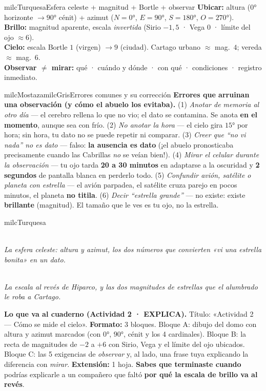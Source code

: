 \documentclass[11pt,letterpaper]{article}
\newcommand{\guiaDiagrama}[2]{%
\begin{center}
\\[1.5mm]
{\footnotesize\itshape\textcolor{milcNegro!75}{#2}}
\end{center}
}
\begin{document}
\begin{drawbox}{milcTurquesa}{Esfera celeste + magnitud + Bortle + observar}
\textbf{Ubicar:} altura ($0°$ horizonte $\to 90°$ cénit) + azimut ($N=0°$, $E=90°$, $S=180°$, $O=270°$). \\[1mm]
\textbf{Brillo:} magnitud aparente, escala \emph{invertida} (Sirio $-1{,}5$ · Vega $0$ · límite del ojo $\approx 6$). \\[1mm]
\textbf{Cielo:} escala Bortle $1$ (virgen) $\to 9$ (ciudad). Cartago urbano $\approx$ mag.\ $4$; vereda $\approx$ mag.\ $6$. \\[1mm]
\textbf{Observar $\neq$ mirar:} qué · cuándo y dónde · con qué · condiciones · registro inmediato.
\end{drawbox}

\begin{softbox}{milcMostaza}{milcGris}{Errores comunes y su corrección}
\textbf{Errores que arruinan una observación (y cómo el abuelo los evitaba).} (1) \emph{Anotar de memoria al otro día} --- el cerebro rellena lo que no vio; el dato se contamina. Se anota \textbf{en el momento}, aunque sea con frío. (2) \emph{No anotar la hora} --- el cielo gira $15°$ por hora; sin hora, tu dato no se puede repetir ni comparar. (3) \emph{Creer que ``no vi nada'' no es dato} --- falso: \textbf{la ausencia es dato} (¡el abuelo pronosticaba precisamente cuando las Cabrillas \emph{no} se veían bien!). (4) \emph{Mirar el celular durante la observación} --- tu ojo tarda \textbf{20 a 30 minutos} en adaptarse a la oscuridad y \textbf{2 segundos} de pantalla blanca en perderlo todo. (5) \emph{Confundir avión, satélite o planeta con estrella} --- el avión parpadea, el satélite cruza parejo en pocos minutos, el planeta \textbf{no titila}. (6) \emph{Decir ``estrella grande''} --- no existe: existe \textbf{brillante} (magnitud). El tamaño que le ves es tu ojo, no la estrella.
\end{softbox}

\begin{infoband}{milcTurquesa}
\guiaDiagrama{assets/astronomia-1/esfera-celeste.tex}{La esfera celeste: altura y azimut, los dos números que convierten «vi una estrella bonita» en un dato.}
\guiaDiagrama{assets/astronomia-1/escala-magnitud.tex}{La escala al revés de Hiparco, y las dos magnitudes de estrellas que el alumbrado le roba a Cartago.}

\textbf{Lo que va al cuaderno (Actividad 2 · EXPLICA).} Título: «Actividad 2 --- Cómo se mide el cielo». \textbf{Formato:} 3 bloques. Bloque A: dibujo del domo con altura y azimut marcados (con $0°$, $90°$, cénit y los 4 cardinales). Bloque B: la recta de magnitudes de $-2$ a $+6$ con Sirio, Vega y el límite del ojo ubicados. Bloque C: las 5 exigencias de \emph{observar} y, al lado, una frase tuya explicando la diferencia con \emph{mirar}. \textbf{Extensión:} 1 hoja. \textbf{Sabes que terminaste cuando} podrías explicarle a un compañero que faltó \textbf{por qué la escala de brillo va al revés}.
\end{infoband}
\end{document}

